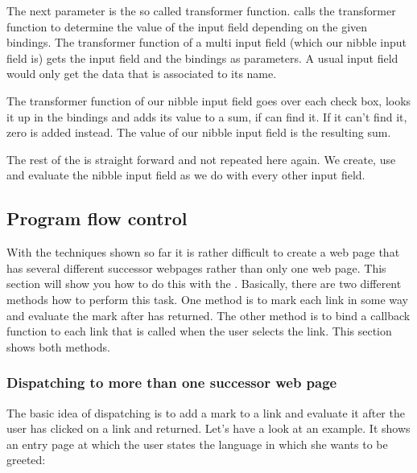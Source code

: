 The next parameter is the so called transformer function.
 calls the transformer function to
determine the value of the input field depending on the given
bindings.  The transformer function of a multi input field (which our
nibble input field is) gets the input field and the bindings as
parameters.  A usual input field would only get the data that is
associated to its name.

The transformer function of our nibble input field goes over each
check box, looks it up in the bindings and adds its value to a sum, if
 can find it.  If it can't find it, zero is
added instead.  The value of our nibble input field is the resulting
sum.

The rest of the \surflet is straight forward and not repeated here
again.  We create, use and evaluate the nibble input field as we do
with every other input field.


\subsection{Program flow control}

With the techniques shown so far it is rather difficult to create a
web page that has several different successor webpages rather than
only one web page.  This section will show you how to do this with the
\surflets.  Basically, there are two different methods how to perform
this task.  One method is to mark each link in some way and evaluate
the mark after  has returned.  The other
method is to bind a callback function to each link that is called when
the user selects the link.  This section shows both methods.

\subsubsection{Dispatching to more than one successor web page}

The basic idea of dispatching is to add a mark to a link and evaluate
it after the user has clicked on a link and 
returned.  Let's have a look at an example.  It shows an entry page at
which the user states the language in which she wants to be greeted:

